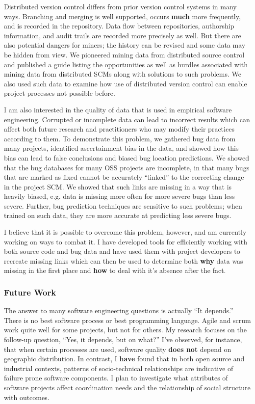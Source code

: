 \documentclass[10pt]{article}
\newcommand\Section[1]{\subsubsection*{\large #1}}
\begin{document}
\begin{small}
Distributed version control differs from prior version control systems in many
ways.  Branching and merging is well supported, occurs \textbf{much} more
frequently, and is recorded in the repository.  Data flow between repositories,
authorship information, and audit trails are recorded more precisely as well.
But there are also potential dangers for miners; the history can be revised and
some data may be hidden from view.  We pioneered mining data from distributed
source control and published a guide listing the opportunities as well as
hurdles associated with mining data from distributed SCMs along with solutions
to such problems.  We also used such data to examine how use of distributed version 
control can enable project processes not possible before.

I am also interested in the quality of data that is used in empirical software
engineering.  Corrupted or incomplete data can lead to incorrect results which
can affect both future research and practitioners who may modify their
practices according to them.  To demonstrate this problem, we gathered bug data
from many projects, identified ascertainment bias in the data, and showed how
this bias can lead to false conclusions and biased bug location predictions.
We showed that the bug databases for many OSS projects are incomplete, in that
many bugs that are marked as fixed cannot be accurately ``linked'' to the
correcting change in the project SCM.  We showed that such links are missing in
a way that is heavily biased, e.g. data is missing more often for more severe
bugs than less severe. Further, bug prediction techniques are sensitive
to such problems; when trained on such data, they are more accurate at predicting
less severe bugs.

I believe that it is possible to overcome this problem, however, and am
currently working on ways to combat it.  I have developed tools for efficiently
working with both source code and bug data and have used them with project
developers to recreate missing links which can then be used to determine both
\textbf{why} data was missing in the first place and \textbf{how} to deal with
it's absence after the fact.

\Section{Future Work}

The answer to many software engineering questions is actually ``It depends.''
There is no best software process or best programming language.  Agile and
scrum work quite well for some projects, but not for others.  My research
focuses on the follow-up question, ``Yes, it depends, but on what?'' I've observed,
for instance, that when certain processes are used, software quality
\textbf{does not} depend on geographic distribution.  In contrast, I \textbf{have} found
that in both open source and industrial contexts, patterns of socio-technical
relationships are indicative of failure prone software components.  I plan to
investigate what attributes of software projects affect coordination needs and
the relationship of social structure with outcomes.


\end{small}
\end{document}
